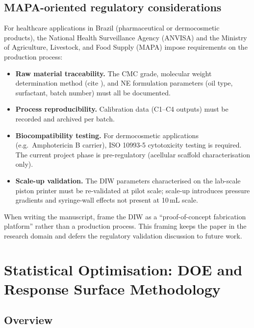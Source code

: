 \documentclass[11pt,a4paper]{article}
\begin{document}
\subsection{MAPA-oriented regulatory considerations}

For healthcare applications in Brazil (pharmaceutical or dermocosmetic
products), the National Health Surveillance Agency (ANVISA) and the
Ministry of Agriculture, Livestock, and Food Supply (MAPA) impose
requirements on the production process:

\begin{itemize}[leftmargin=1.6em,itemsep=2pt]
\item \textbf{Raw material traceability.} The CMC grade, molecular weight
  determination method (cite \citealt{daSilva2018}), and NE formulation
  parameters (oil type, surfactant, batch number) must all be documented.
\item \textbf{Process reproducibility.} Calibration data (C1--C4 outputs)
  must be recorded and archived per batch.
\item \textbf{Biocompatibility testing.} For dermocosmetic applications
  (e.g.\ Amphotericin B carrier), ISO 10993-5 cytotoxicity testing is
  required. The current project phase is pre-regulatory (acellular
  scaffold characterisation only).
\item \textbf{Scale-up validation.} The DIW parameters characterised on
  the lab-scale piston printer must be re-validated at pilot scale;
  scale-up introduces pressure gradients and syringe-wall effects not
  present at 10\,mL scale.
\end{itemize}

\begin{tipbox}
When writing the manuscript, frame the DIW as a ``proof-of-concept
fabrication platform'' rather than a production process. This framing
keeps the paper in the research domain and defers the regulatory
validation discussion to future work.
\end{tipbox}

\section{Statistical Optimisation: DOE and Response Surface Methodology}
\label{sec:doe}

\subsection{Overview}
\end{document}
